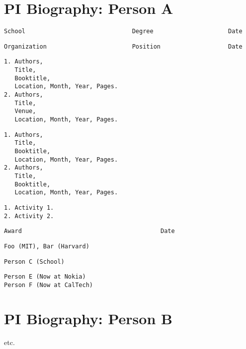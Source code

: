 \section*{PI Biography: Person A}
%
{}
%
\begin{verbatim}
School                              Degree                     Date
\end{verbatim}


\begin{verbatim}
Organization                        Position                   Date
\end{verbatim}


\begin{verbatim}
1. Authors,
   Title,
   Booktitle,
   Location, Month, Year, Pages.
2. Authors,
   Title,
   Venue,
   Location, Month, Year, Pages.
\end{verbatim}


\begin{verbatim}
1. Authors,
   Title,
   Booktitle,
   Location, Month, Year, Pages.
2. Authors,
   Title,
   Booktitle,
   Location, Month, Year, Pages.
\end{verbatim}


\begin{verbatim}
1. Activity 1.
2. Activity 2.
\end{verbatim}


\begin{verbatim}
Award                                       Date
\end{verbatim}

\begin{verbatim}
Foo (MIT), Bar (Harvard)
\end{verbatim}


\begin{verbatim}
Person C (School)
\end{verbatim}


\begin{verbatim}
Person E (Now at Nokia)
Person F (Now at CalTech)
\end{verbatim}

\newpage

\section*{PI Biography: Person B}

etc.

